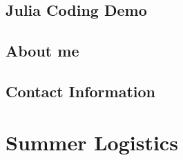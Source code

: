 \documentclass[a4paper,12pt,onecolumn]{article}
\begin{document}



\subsection{Julia Coding Demo} %
\label{ssub:julia_coding_demo}


\subsection{About me} %
\label{ssub:about_me}


\subsection{Contact Information} %
\label{ssub:contact_information}


\section{Summer Logistics} %
\label{sec:summer_logistics}




\end{document}
